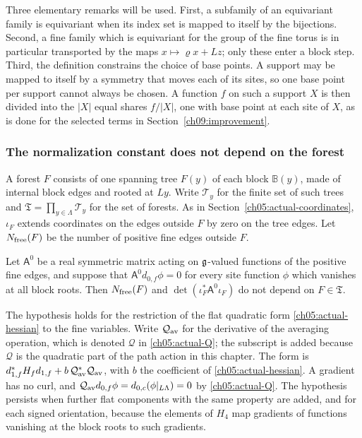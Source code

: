 Three elementary remarks will be used. First, a subfamily of an
equivariant family is equivariant when its index set is mapped to
itself by the bijections. Second, a fine family which is equivariant
for the group of the fine torus is in particular transported by the
maps $x\mapsto\varrho x+Lz$; only these enter a block step. Third, the
definition constrains the choice of base points. A support may be mapped to
itself by a symmetry that moves each of its sites, so one base point per
support cannot always be chosen. A function $f$ on such a support $X$ is
then divided into the $|X|$ equal shares $f/|X|$, one with base point at each
site of $X$, as is done for the selected terms in
Section~\ref{ch09:improvement}.

\subsubsection*{The normalization constant does not depend on the forest}

A forest $F$ consists of one spanning tree $F(y)$ of each block
$\mathbb B(y)$, made of internal block edges and rooted at $Ly$. Write
$\mathcal T_y$ for the finite set of such trees and
$\mathfrak T=\prod_{y\in\Lambda}\mathcal T_y$ for the set of forests.
As in Section~\ref{ch05:actual-coordinates}, $\iota_F$ extends
coordinates on the edges outside $F$ by zero on the tree edges.
Let $N_{\rm free}(F)$ be the number of positive fine edges outside $F$.

\begin{lemma}
\label{ch09:forest-determinant}
Let $\mathsf A^0$ be a real symmetric matrix acting on $\mathfrak g$-valued
functions of the positive fine edges, and suppose that
$\mathsf A^0d_{0,f}\phi=0$ for every site function $\phi$ which vanishes
at all block roots. Then $N_{\rm free}(F)$ and
$\det(\iota_F^*\mathsf A^0\iota_F)$ do not depend on $F\in\mathfrak T$.
\end{lemma}

The hypothesis holds for the restriction of the flat quadratic form
\eqref{ch05:actual-hessian} to the fine variables. Write
$\mathcal Q_{\rm av}$ for the derivative of the averaging operation, which is
denoted $\mathcal Q$ in \eqref{ch05:actual-Q}; the subscript is added
because $\mathcal Q$ is the quadratic part of the path action in this
chapter. The form is
$d_{1,f}^*H_fd_{1,f}+b\,\mathcal Q_{\rm av}^*\mathcal Q_{\rm av}$,
with $b$ the coefficient of \eqref{ch05:actual-hessian}. A gradient has
no curl, and
$\mathcal Q_{\rm av}d_{0,f}\phi=d_{0,c}(\phi|_{L\Lambda})=0$ by
\eqref{ch05:actual-Q}. The hypothesis persists when further flat components
with the same property are added, and for each signed orientation,
because the elements of $H_4$ map gradients of functions vanishing at
the block roots to such gradients.

